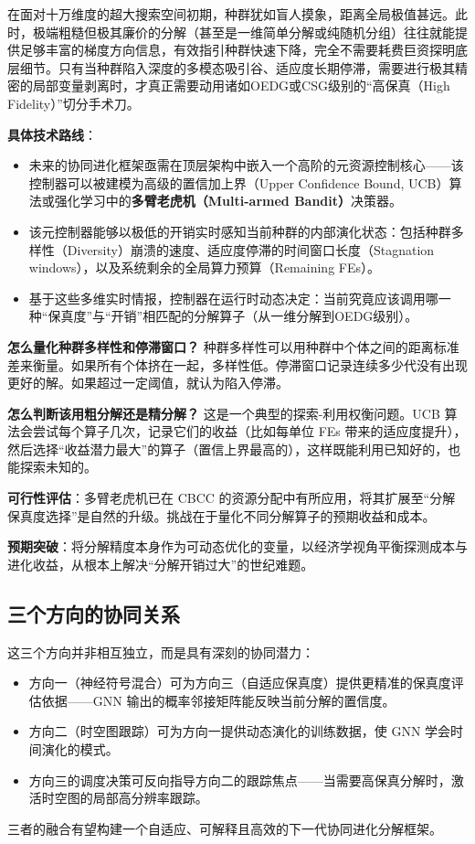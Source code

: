 在面对十万维度的超大搜索空间初期，种群犹如盲人摸象，距离全局极值甚远。此时，极端粗糙但极其廉价的分解（甚至是一维简单分解或纯随机分组）往往就能提供足够丰富的梯度方向信息，有效指引种群快速下降，完全不需要耗费巨资探明底层细节。只有当种群陷入深度的多模态吸引谷、适应度长期停滞，需要进行极其精密的局部变量剥离时，才真正需要动用诸如OEDG或CSG级别的“高保真（High Fidelity）”切分手术刀。

\textbf{具体技术路线}：
\begin{itemize}
    \item 未来的协同进化框架亟需在顶层架构中嵌入一个高阶的元资源控制核心——该控制器可以被建模为高级的置信加上界（Upper Confidence Bound, UCB）算法或强化学习中的\textbf{多臂老虎机（Multi-armed Bandit）}决策器。
    \item 该元控制器能够以极低的开销实时感知当前种群的内部演化状态：包括种群多样性（Diversity）崩溃的速度、适应度停滞的时间窗口长度（Stagnation windows），以及系统剩余的全局算力预算（Remaining FEs）。
    \item 基于这些多维实时情报，控制器在运行时动态决定：当前究竟应该调用哪一种“保真度”与“开销”相匹配的分解算子（从一维分解到OEDG级别）。
\end{itemize}

\textbf{怎么量化种群多样性和停滞窗口？} 种群多样性可以用种群中个体之间的距离标准差来衡量。如果所有个体挤在一起，多样性低。停滞窗口记录连续多少代没有出现更好的解。如果超过一定阈值，就认为陷入停滞。

\textbf{怎么判断该用粗分解还是精分解？} 这是一个典型的探索-利用权衡问题。UCB 算法会尝试每个算子几次，记录它们的收益（比如每单位 FEs 带来的适应度提升），然后选择“收益潜力最大”的算子（置信上界最高的），这样既能利用已知好的，也能探索未知的。

\textbf{可行性评估}：多臂老虎机已在 CBCC 的资源分配中有所应用，将其扩展至“分解保真度选择”是自然的升级。挑战在于量化不同分解算子的预期收益和成本。

\textbf{预期突破}：将分解精度本身作为可动态优化的变量，以经济学视角平衡探测成本与进化收益，从根本上解决“分解开销过大”的世纪难题。

\subsection{三个方向的协同关系}
这三个方向并非相互独立，而是具有深刻的协同潜力：
\begin{itemize}
    \item 方向一（神经符号混合）可为方向三（自适应保真度）提供更精准的保真度评估依据——GNN 输出的概率邻接矩阵能反映当前分解的置信度。
    \item 方向二（时空图跟踪）可为方向一提供动态演化的训练数据，使 GNN 学会时间演化的模式。
    \item 方向三的调度决策可反向指导方向二的跟踪焦点——当需要高保真分解时，激活时空图的局部高分辨率跟踪。
\end{itemize}
三者的融合有望构建一个自适应、可解释且高效的下一代协同进化分解框架。

